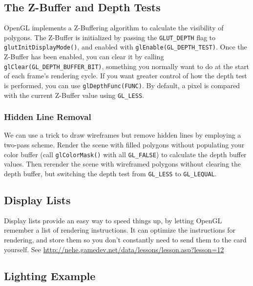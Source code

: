 \documentclass[]{article}
\begin{document}
\subsection{The Z-Buffer and Depth Tests}

OpenGL implements a Z-Buffering algorithm to calculate the visibility of polygons. The Z-Buffer is initialized by passing the \verb=GLUT_DEPTH= flag to \verb=glutInitDisplayMode()=, and enabled with \verb=glEnable(GL_DEPTH_TEST)=. Once the Z-Buffer has been enabled, you can clear it by calling \verb=glClear(GL_DEPTH_BUFFER_BIT)=, something you normally want to do at the start of each frame's rendering cycle. If you want greater control of how the depth test is performed, you can use \verb=glDepthFunc(FUNC)=. By default, a pixel is compared with the current Z-Buffer value using \verb=GL_LESS=. 

\subsubsection{Hidden Line Removal}
We can use a trick to draw wireframes but remove hidden lines by employing a two-pass scheme. Render the scene with filled polygons without populating your color buffer (call \verb=glColorMask()= with all \verb=GL_FALSE=) to calculate the depth buffer values. Then rerender the scene with wireframed polygons without clearing the depth buffer, but switching the depth test from \verb=GL_LESS= to \verb=GL_LEQUAL=.

\subsection{Display Lists}

Display lists provide an easy way to speed things up, by letting OpenGL remember a list of rendering instructions. It can optimize the instructions for rendering, and store them so you don't constantly need to send them to the card yourself. See \url{http://nehe.gamedev.net/data/lessons/lesson.asp?lesson=12}

\pagebreak

\subsection{Lighting Example\label{exLights}}
\end{document}
